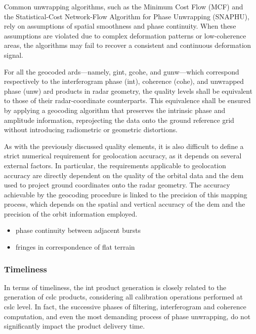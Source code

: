 Common unwrapping algorithms, such as the Minimum Cost Flow (MCF) and the Statistical-Cost Network-Flow Algorithm for Phase Unwrapping (SNAPHU), rely on assumptions of spatial smoothness and phase continuity. When these assumptions are violated due to complex deformation patterns or low-coherence areas, the algorithms may fail to recover a consistent and continuous deformation signal.

For all the geocoded \acs{ard}s—namely, \acs{gint}, \acs{gcohe}, and \acs{gunw}—which correspond respectively to the interferogram phase (\acs{int}), coherence (\acs{cohe}), and unwrapped phase (\acs{unw}) \acs{ard} products in radar geometry, the quality levels shall be equivalent to those of their radar-coordinate counterparts. This equivalence shall be ensured by applying a geocoding algorithm that preserves the intrinsic phase and amplitude information, reprojecting the data onto the ground reference grid without introducing radiometric or geometric distortions.

As with the previously discussed quality elements, it is also difficult to define a strict numerical requirement for geolocation accuracy, as it depends on several external factors. In particular, the requirements applicable to geolocation accuracy are directly dependent on the quality of the orbital data and the \acs{dem} used to project ground coordinates onto the radar geometry. The accuracy achievable by the geocoding procedure is linked to the precision of this mapping process, which depends on the spatial and vertical accuracy of the \acs{dem} and the precision of the orbit information employed.

\begin{itemize}
\item phase continuity between adjacent bursts
\item fringes in correspondence of flat terrain
\end{itemize}

\subsubsection{Timeliness}
In terms of timeliness, the \acs{int} product generation is closely related to the generation of \acs{cslc} products, considering all calibration operations performed at \acs{cslc} level. In fact, the successive phases of filtering, interferogram and coherence computation, and even the most demanding process of phase unwrapping, do not significantly impact the product delivery time.

